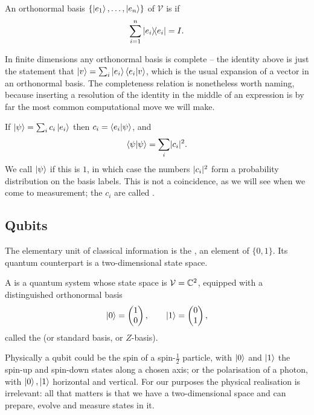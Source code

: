 \documentclass[a4paper]{scrartcl}
\newcommand{\Vs}{\mathcal{V}}
\begin{document}
\begin{definition}
	An orthonormal basis $\{\ket{e_1}, \dots, \ket{e_n}\}$ of $\Vs$ is  if
	$$\sum_{i = 1}^n \op{e_i}{e_i} = I.$$
\end{definition}

In finite dimensions any orthonormal basis is complete -- the identity above is just the statement that $\ket{v} = \sum_i \ket{e_i}\ip{e_i}{v}$, which is the usual expansion of a vector in an orthonormal basis. The completeness relation is nonetheless worth naming, because inserting a resolution of the identity in the middle of an expression is by far the most common computational move we will make.

If $\ket{\psi} = \sum_i c_i \ket{e_i}$ then $c_i = \ip{e_i}{\psi}$, and
$$\ip{\psi}{\psi} = \sum_i \abs{c_i}^2.$$
We call $\ket{\psi}$  if this is $1$, in which case the numbers $\lvert c_i\rvert^2$ form a probability distribution on the basis labels. This is not a coincidence, as we will see when we come to measurement; the $c_i$ are called .

\subsection{Qubits}

The elementary unit of classical information is the , an element of $\{0,1\}$. Its quantum counterpart is a two-dimensional state space.

\begin{definition}[Qubit]
	A  is a quantum system whose state space is $\Vs = \C^2$, equipped with a distinguished orthonormal basis
	$$\ket{0} = \begin{pmatrix} 1 \\ 0\end{pmatrix}, \qquad \ket{1} = \begin{pmatrix} 0 \\ 1 \end{pmatrix},$$
	called the  (or standard basis, or $Z$-basis).
\end{definition}

Physically a qubit could be the spin of a spin-$\tfrac12$ particle, with $\ket{0}$ and $\ket{1}$ the spin-up and spin-down states along a chosen axis; or the polarisation of a photon, with $\ket{0}, \ket{1}$ horizontal and vertical. For our purposes the physical realisation is irrelevant: all that matters is that we have a two-dimensional space and can prepare, evolve and measure states in it.
\end{document}
